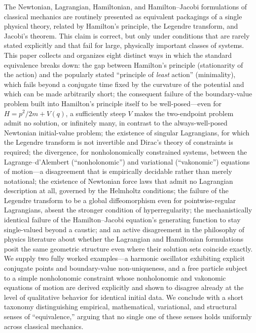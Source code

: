 The Newtonian, Lagrangian, Hamiltonian, and Hamilton--Jacobi formulations of
classical mechanics are routinely presented as equivalent packagings of a
single physical theory, related by Hamilton's principle, the Legendre
transform, and Jacobi's theorem. This claim is correct, but only under
conditions that are rarely stated explicitly and that fail for large,
physically important classes of systems. This paper collects and organizes
eight distinct ways in which the standard equivalence breaks down: the gap
between Hamilton's principle (stationarity of the action) and the popularly
stated ``principle of \emph{least} action'' (minimality), which fails beyond a
conjugate time fixed by the curvature of the potential and which can be made
arbitrarily short; the consequent failure of the boundary-value problem built
into Hamilton's principle itself to be well-posed---even for $H=p^2/2m+V(q)$, a
sufficiently steep $V$ makes the two-endpoint problem admit no solution, or
infinitely many, in contrast to the always-well-posed Newtonian initial-value
problem; the existence of singular Lagrangians, for which the Legendre
transform is not invertible and Dirac's theory of constraints is required; the
divergence, for nonholonomically constrained systems, between the
Lagrange--d'Alembert (``nonholonomic'') and variational (``vakonomic'')
equations of motion---a disagreement that is empirically decidable rather than
merely notational; the existence of Newtonian force laws that admit no
Lagrangian description at all, governed by the Helmholtz conditions; the
failure of the Legendre transform to be a global diffeomorphism even for
pointwise-regular Lagrangians, absent the stronger condition of
hyperregularity; the mechanistically identical failure of the Hamilton--Jacobi
equation's generating function to stay single-valued beyond a caustic; and an
active disagreement in the philosophy of physics literature about whether the
Lagrangian and Hamiltonian formulations posit the same geometric structure even
where their solution sets coincide exactly. We supply two fully worked
examples---a harmonic oscillator exhibiting explicit conjugate points and
boundary-value non-uniqueness, and a free particle subject to a simple
nonholonomic constraint whose nonholonomic and vakonomic equations of motion
are derived explicitly and shown to disagree already at the level of
qualitative behavior for identical initial data. We conclude with a short
taxonomy distinguishing empirical, mathematical, variational, and structural
senses of ``equivalence,'' arguing that no single one of these senses holds
uniformly across classical mechanics.

